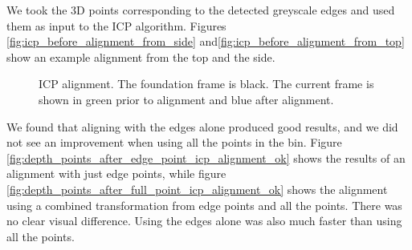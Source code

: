 \documentclass[12pt,a4paper,onecolumn]{article}
\begin{document}
We took the 3D points corresponding to the detected greyscale edges and used them as input to the ICP algorithm.  Figures \ref{fig:icp_before_alignment_from_side} and\ref{fig:icp_before_alignment_from_top} show an example alignment from the top and the side.

\begin{figure}[!ht]
    \centering
      \caption{ICP alignment.  The foundation frame is black.  The current frame is shown in green prior to alignment and blue after alignment.}
\end{figure}

We found that aligning with the edges alone produced good results, and we did not see an improvement when using all the points in the bin.  Figure \ref{fig:depth_points_after_edge_point_icp_alignment_ok} shows the results of an alignment with just edge points, while figure \ref{fig:depth_points_after_full_point_icp_alignment_ok} shows the alignment using a combined transformation from edge points and all the points.  There was no clear visual difference.  Using the edges alone was also much faster than using all the points.
\end{document}
